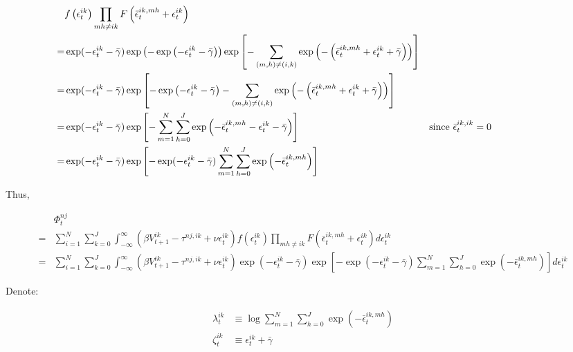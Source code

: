 \documentclass[10pt]{article}
\begin{document}
\begin{align}
    &f\left(\epsilon_t^{i k}\right) \prod_{m h \neq i k} F\left(\bar{\epsilon}_t^{i k, m h}+\epsilon_t^{i k}\right) \\
    = &\exp ( - \epsilon_t^{i k} - \bar{\gamma}) \exp \left( -\exp \left( - \epsilon_t^{i k} - \bar{\gamma} \right) \right)
        \exp \left[-\sum_{(m, h) \neq(i, k)} \exp \left(-\left(\bar{\epsilon}_t^{i k, m h}+\epsilon_t^{i k}+\bar{\gamma}\right)\right)\right] \\
    = & \exp ( - \epsilon_t^{i k} - \bar{\gamma}) \exp \left[ -\exp \left( - \epsilon_t^{i k} - \bar{\gamma} \right) - \sum_{(m, h) \neq(i, k)} \exp \left(-\left(\bar{\epsilon}_t^{i k, m h}+\epsilon_t^{i k}+\bar{\gamma}\right)\right) \right] \\
    = & \exp ( - \epsilon_t^{i k} - \bar{\gamma}) \exp \left[  - \sum_{m=1}^N \sum_{h=0}^J \exp \left( -\bar{\epsilon}_t^{i k, m h}-\epsilon_t^{i k}-\bar{\gamma} \right) \right] && \parbox[t]{4cm}{\raggedright since $\bar{\epsilon}_t^{i k, i k} = 0$} \\
    = & \exp ( - \epsilon_t^{i k} - \bar{\gamma}) \exp \left[ - \exp(-\epsilon_t^{i k} - \bar{\gamma}) \sum_{m=1}^N \sum_{h=0}^J \exp \left( -\bar{\epsilon}_t^{i k, m h} \right) \right] 
\end{align}

Thus,

\begin{align}
    &\Phi_t^{n j} \\
    =&\sum_{i=1}^N \sum_{k=0}^J \int_{-\infty}^{\infty}\left(\beta V_{t+1}^{i k}-\tau^{n j, i k}+\nu \epsilon_t^{i k}\right) f\left(\epsilon_t^{i k}\right) \prod_{m h \neq i k} F\left(\bar{\epsilon}_t^{i k, m h}+\epsilon_t^{i k}\right) d \epsilon_t^{i k} \\
    = &\sum_{i=1}^N \sum_{k=0}^J \int_{-\infty}^{\infty}\left(\beta V_{t+1}^{i k}-\tau^{n j, i k}+\nu \epsilon_t^{i k}\right) \exp ( - \epsilon_t^{i k} - \bar{\gamma}) \exp \left[ - \exp(-\epsilon_t^{i k} - \bar{\gamma}) \sum_{m=1}^N \sum_{h=0}^J \exp \left( -\bar{\epsilon}_t^{i k, m h} \right) \right] d \epsilon_t^{i k}
\end{align}

Denote:

\begin{align}
    \lambda_t^{i k} &\equiv \log \sum_{m=1}^N \sum_{h=0}^J \exp \left(-\bar{\epsilon}_t^{i k, m h}\right) \\
    \zeta_t^{i k} &\equiv \epsilon_t^{i k}+\bar{\gamma}
\end{align}
\end{document}
